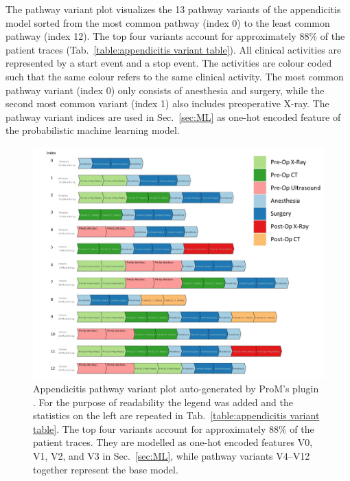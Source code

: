 The pathway variant plot visualizes the 13 pathway variants of the
appendicitis model sorted from the most common pathway (index 0) to
the least common pathway (index 12).
The top four variants account for approximately 88\% of the patient
traces (Tab.~\ref{table:appendicitis variant table}).
All clinical activities are represented by a start event and a stop
event.
The activities are colour coded such that the same colour refers to the same clinical activity. The most common pathway variant (index 0) only consists of anesthesia and surgery, while the second most common variant (index 1) also includes preoperative X-ray.
The pathway variant indices are used in Sec.~\ref{sec:ML} as one-hot
encoded feature of the probabilistic machine learning model.

\begin{figure}[t]
\hspace{-2cm}
\includegraphics[width=1.5\textwidth]{images/appendicitis_variant_index_anes.jpg}
\caption{Appendicitis pathway variant plot auto-generated by ProM's
  plugin . 
  For the purpose of readability the legend was added and the
  statistics on the left are repeated in Tab.~\ref{table:appendicitis variant table}.
 The top four variants account for approximately 88\% of the patient
 traces. They are modelled as one-hot encoded features V0, V1, V2, and V3
 in Sec.~\ref{sec:ML}, while pathway variants V4--V12 together represent
 the base model.
 }
\label{fig:appendicitis pathway variants}
\end{figure}
\clearpage

